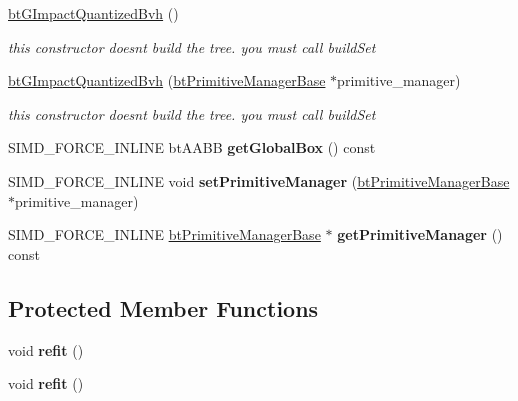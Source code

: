 \begin{DoxyCompactItemize}
\mbox{\label{classbtGImpactQuantizedBvh_a3adf6c64b003214564e045326e4fabb7}} 
\hyperlink{classbtGImpactQuantizedBvh_a3adf6c64b003214564e045326e4fabb7}{bt\+G\+Impact\+Quantized\+Bvh} ()
\begin{DoxyCompactList}\small\item\em this constructor doesn\textquotesingle{}t build the tree. you must call build\+Set \end{DoxyCompactList}\item 
\mbox{\label{classbtGImpactQuantizedBvh_a567d06bf430c21fe4887f1b996bb6ba4}} 
\hyperlink{classbtGImpactQuantizedBvh_a567d06bf430c21fe4887f1b996bb6ba4}{bt\+G\+Impact\+Quantized\+Bvh} (\hyperlink{classbtPrimitiveManagerBase}{bt\+Primitive\+Manager\+Base} $\ast$primitive\+\_\+manager)
\begin{DoxyCompactList}\small\item\em this constructor doesn\textquotesingle{}t build the tree. you must call build\+Set \end{DoxyCompactList}\item 
\mbox{\label{classbtGImpactQuantizedBvh_ae6f71b24b0b7f76ab0807e760da9f448}} 
S\+I\+M\+D\+\_\+\+F\+O\+R\+C\+E\+\_\+\+I\+N\+L\+I\+NE bt\+A\+A\+BB {\bfseries get\+Global\+Box} () const
\item 
\mbox{\label{classbtGImpactQuantizedBvh_ab4e8e255305f61908ca119fb751bf22c}} 
S\+I\+M\+D\+\_\+\+F\+O\+R\+C\+E\+\_\+\+I\+N\+L\+I\+NE void {\bfseries set\+Primitive\+Manager} (\hyperlink{classbtPrimitiveManagerBase}{bt\+Primitive\+Manager\+Base} $\ast$primitive\+\_\+manager)
\item 
\mbox{\label{classbtGImpactQuantizedBvh_a49c35409277baa45df040daf2bf063a6}} 
S\+I\+M\+D\+\_\+\+F\+O\+R\+C\+E\+\_\+\+I\+N\+L\+I\+NE \hyperlink{classbtPrimitiveManagerBase}{bt\+Primitive\+Manager\+Base} $\ast$ {\bfseries get\+Primitive\+Manager} () const
\end{DoxyCompactItemize}
\subsection*{Protected Member Functions}
\begin{DoxyCompactItemize}
\item 
\mbox{\label{classbtGImpactQuantizedBvh_a7aa23f402fe08b65576b3a5a24a6efb6}} 
void {\bfseries refit} ()
\item 
\mbox{\label{classbtGImpactQuantizedBvh_a7aa23f402fe08b65576b3a5a24a6efb6}} 
void {\bfseries refit} ()
\end{DoxyCompactItemize}
